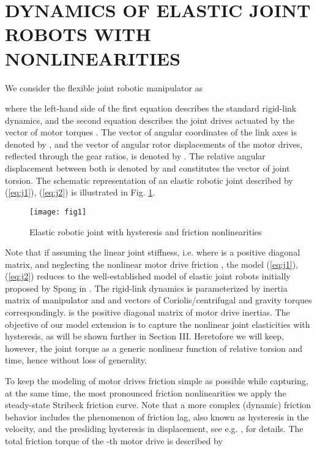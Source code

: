 \documentclass[a4paper, 10pt, conference]{ieeeconf}
\begin{document}
\section{DYNAMICS OF ELASTIC JOINT ROBOTS WITH NONLINEARITIES}
\label{sec:2}


We consider the flexible joint robotic manipulator as

where the left-hand side of the first equation describes the
standard rigid-link dynamics, and the second equation describes
the joint drives actuated by the vector of motor torques . The
vector of angular coordinates of the link axes is denoted by ,
and the vector of angular rotor displacements of the motor drives,
reflected through the gear ratios, is denoted by . The
relative angular displacement between both is denoted by  and constitutes the vector of joint torsion. The
schematic representation of an elastic robotic joint described by
(\ref{eq:j1}), (\ref{eq:j2}) is illustrated in Fig.
\ref{fig:joint}.
\begin{figure}[!h]
\centering
\texttt{[image: fig1]}
\caption{Elastic robotic joint with hysteresis and friction
nonlinearities} \label{fig:joint}
\end{figure}
Note that if assuming the linear joint stiffness, i.e.  where  is a positive diagonal matrix, and neglecting
the nonlinear motor drive friction , the model (\ref{eq:j1}),
(\ref{eq:j2}) reduces to the well-established model of elastic
joint robots initially proposed by Spong in \cite{spong87}. The
rigid-link dynamics is parameterized by  inertia matrix of manipulator and  and  vectors of
Coriolis/centrifugal and gravity torques correspondingly.  is the positive
diagonal matrix of motor drive inertias. The objective of our
model extension is to capture the nonlinear joint elasticities
with hysteresis, as will be shown further in Section III.
Heretofore we will keep, however, the joint torque  as a
generic nonlinear function of relative torsion and time, hence
without loss of generality.

To keep the modeling of motor drives friction simple as possible
while capturing, at the same time, the most pronounced friction
nonlinearities we apply the steady-state Stribeck friction curve.
Note that a more complex (dynamic) friction behavior includes the
phenomenon of friction lag, also known as hysteresis in the
velocity, and the presliding hysteresis in displacement, see e.g.
\cite{ArmstDupontCan94}, \cite{AlBendSwev08} for details. The
total friction torque of the -th motor
drive is described by
\end{document}
